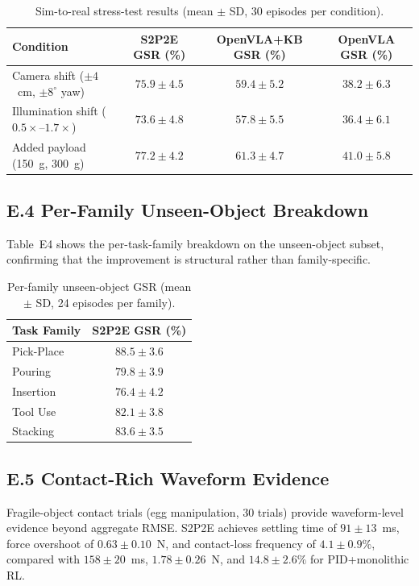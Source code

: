\documentclass[11pt]{article}
\begin{document}
\begin{table}[htbp]
\centering
\caption{Sim-to-real stress-test results (mean $\pm$ SD, 30 episodes per condition).}
\label{tab:stress_test}
\small\setlength{\tabcolsep}{4pt}
\begin{tabular}{@{}l c c c@{}}
\toprule
Condition & S2P2E GSR (\%) & OpenVLA+KB GSR (\%) & OpenVLA GSR (\%) \\
\midrule
Camera shift ($\pm4$~cm, $\pm8^\circ$ yaw) & $75.9 \pm 4.5$ & $59.4 \pm 5.2$ & $38.2 \pm 6.3$ \\
Illumination shift ($0.5\times$--$1.7\times$) & $73.6 \pm 4.8$ & $57.8 \pm 5.5$ & $36.4 \pm 6.1$ \\
Added payload (150~g, 300~g) & $77.2 \pm 4.2$ & $61.3 \pm 4.7$ & $41.0 \pm 5.8$ \\
\bottomrule
\end{tabular}
\end{table}

\subsection{E.4 Per-Family Unseen-Object Breakdown}

Table~E4 shows the per-task-family breakdown on the unseen-object subset, confirming that the improvement is structural rather than family-specific.

\begin{table}[htbp]
\centering
\caption{Per-family unseen-object GSR (mean $\pm$ SD, 24 episodes per family).}
\label{tab:unseen_family}
\small\setlength{\tabcolsep}{4pt}
\begin{tabular}{@{}l c@{}}
\toprule
Task Family & S2P2E GSR (\%) \\
\midrule
Pick-Place & $88.5 \pm 3.6$ \\
Pouring    & $79.8 \pm 3.9$ \\
Insertion  & $76.4 \pm 4.2$ \\
Tool Use   & $82.1 \pm 3.8$ \\
Stacking   & $83.6 \pm 3.5$ \\
\bottomrule
\end{tabular}
\end{table}

\subsection{E.5 Contact-Rich Waveform Evidence}

Fragile-object contact trials (egg manipulation, 30 trials) provide waveform-level evidence beyond aggregate RMSE. S2P2E achieves settling time of $91\pm13$~ms, force overshoot of $0.63\pm0.10$~N, and contact-loss frequency of $4.1\pm0.9\%$, compared with $158\pm20$~ms, $1.78\pm0.26$~N, and $14.8\pm2.6\%$ for PID+monolithic RL.
\end{document}
